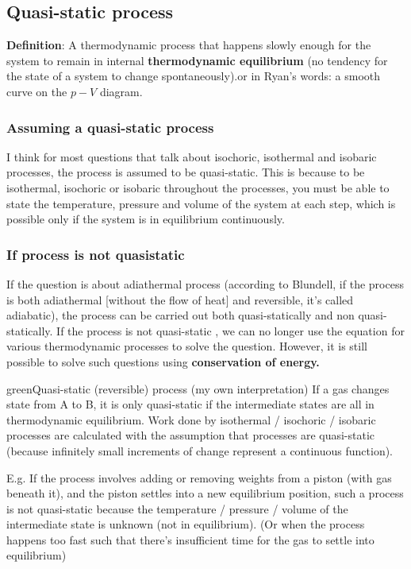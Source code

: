 \subsection{Quasi-static process}
\textbf{Definition}: A thermodynamic process that happens slowly enough for the system to remain in internal \textbf{thermodynamic equilibrium} (no tendency for the state of a system to change spontaneously).or in Ryan's words: a smooth curve on the $p-V$ diagram.
\subsubsection{Assuming a quasi-static process}
I think for most questions that talk about isochoric, isothermal and isobaric processes, the process is assumed to be quasi-static. This is because to be isothermal, isochoric or isobaric throughout the processes, you must be able to state the temperature, pressure and volume of the system at each step, which is possible only if the system is in equilibrium continuously.

\subsubsection{If process is not quasistatic}

If the question is about adiathermal process (according to Blundell, if the process is both adiathermal [without the flow of heat] and reversible, it's called adiabatic), the process can be carried out both quasi-statically and non quasi-statically. If the process is not quasi-static , we can no longer use the equation for various thermodynamic processes to solve the question. However, it is still possible to solve such questions using \textbf{conservation of energy.}

\begin{mybox}{green}{Quasi-static (reversible) process (my own interpretation)}
    If a gas changes state from A to B, it is only quasi-static if the intermediate states are all in thermodynamic equilibrium. Work done by isothermal / isochoric / isobaric processes are calculated with the assumption that processes are quasi-static (because infinitely small increments of change represent a continuous function).

    \begin{flushleft}
        E.g. If the process involves adding or removing weights from a piston (with gas beneath it), and the piston settles into a new equilibrium position, such a process is not quasi-static because the temperature / pressure / volume of the intermediate state is unknown (not in equilibrium). (Or when the process happens too fast such that there's insufficient time for the gas to settle into equilibrium)
    \end{flushleft}

\end{mybox}


